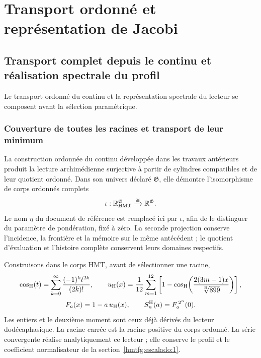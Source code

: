 \section{Transport ordonné et représentation de Jacobi}
\label{hmtfg:fragmento:transporte-ordenado-y-representacion-de-jacobi}

\subsection{Transport complet depuis le continu et réalisation spectrale du profil}
\label{hmtfg:escalado:14}

Le transport ordonné du continu et la représentation spectrale du lecteur se composent avant la sélection paramétrique.

\subsubsection{Couverture de toutes les racines et transport de leur minimum}
\label{hmtfg:escalado:14.1}

La construction ordonnée du continu développée dans les travaux antérieurs produit la lecture archimédienne surjective à partir de cylindres compatibles et de leur quotient ordonné. Dans son univers déclaré \(\mathfrak G\), elle démontre l’isomorphisme de corps ordonnés complets
\begin{equation}
\iota:\mathbb R_{\rm HMT}^{\mathfrak G}
   \xrightarrow{\cong}\mathbb R^{\mathfrak G}.
\label{hmtfg:escalado:eq:37}
\end{equation}
Le nom \(\eta\) du document de référence est remplacé ici par \(\iota\), afin de le distinguer du paramètre de pondération, fixé à zéro. La seconde projection conserve l’incidence, la frontière et la mémoire sur le même antécédent ; le quotient d’évaluation et l’histoire complète conservent leurs domaines respectifs.

Construisons dans le corps HMT, avant de sélectionner une racine,
\[
\cos_{\rm H}(t)=\sum_{k=0}^{\infty}\frac{(-1)^kt^{2k}}{(2k)!},
\qquad
u_{\rm H}(x)=\frac1{12}\sum_{m=1}^{12}
\left[1-\cos_{\rm H}\!\left(\frac{2(3m-1)x}{\sqrt[\rm H]{899}}\right)\right],
\]
\begin{equation}
F_a(x)=1-a\,u_{\rm H}(x),\qquad S_n^{\rm H}(a)=F_a^{\,2^n}(0).
\label{hmtfg:escalado:eq:38}
\end{equation}
Les entiers et le deuxième moment sont ceux déjà dérivés du lecteur dodécaphasique. La racine carrée est la racine positive du corps ordonné. La série convergente réalise analytiquement ce lecteur ; elle conserve le profil et le coefficient normalisateur de la section~\ref{hmtfg:escalado:1}.

